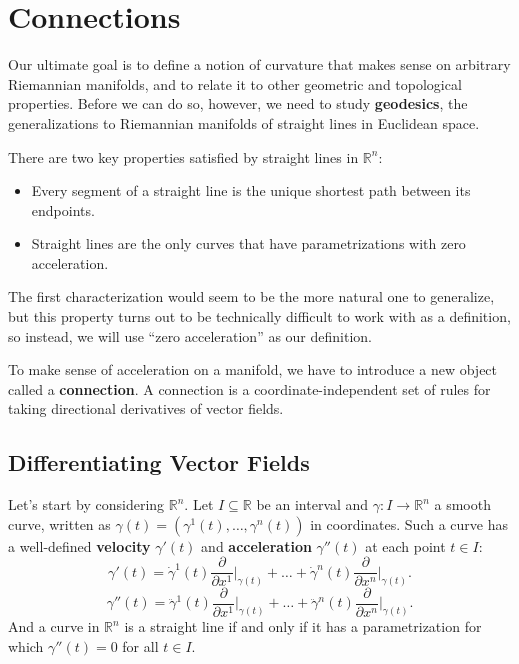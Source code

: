 \documentclass[../main.tex]{subfiles}
\begin{document}
\chapter{Connections}

Our ultimate goal is to define a notion of curvature that makes sense on arbitrary Riemannian manifolds, and to relate it to other geometric and topological properties. Before we can do so, however, we need to study \textbf{geodesics}, the generalizations to Riemannian manifolds of straight lines in Euclidean space.

There are two key properties satisfied by straight lines in $\mathbb{R}^n$:
\begin{itemize}
	\item Every segment of a straight line is the unique shortest path between its endpoints.
	\item Straight lines are the only curves that have parametrizations with zero acceleration.
\end{itemize}
The first characterization would seem to be the more natural one to generalize, but this property turns out to be technically difficult to work with as a definition, so instead, we will use ``zero acceleration'' as our definition.

To make sense of acceleration on a manifold, we have to introduce a new object called a \textbf{connection}. A connection is a coordinate-independent set of rules for taking directional derivatives of vector fields.

\section{Differentiating Vector Fields}
Let's start by considering $\mathbb{R}^n$. Let $I \subseteq \mathbb{R}$ be an interval and $\gamma: I \to \mathbb{R}^n$ a smooth curve, written as $\gamma(t) = (\gamma^1(t), \ldots, \gamma^n(t))$ in coordinates. Such a curve has a well-defined \textbf{velocity} $\gamma'(t)$ and \textbf{acceleration} $\gamma''(t)$ at each point $t \in I$:
\begin{equation}
	\gamma'(t) = \dot{\gamma}^1(t) \frac{\partial}{\partial x^1} \bigg|_{\gamma(t)} + \ldots + \dot{\gamma}^n(t) \frac{\partial}{\partial x^n} \bigg|_{\gamma(t)}.
\end{equation}
\begin{equation}
	\gamma''(t) = \ddot{\gamma}^1(t) \frac{\partial}{\partial x^1} \bigg|_{\gamma(t)} + \ldots + \ddot{\gamma}^n(t) \frac{\partial}{\partial x^n} \bigg|_{\gamma(t)}.
\end{equation}
And a curve in $\mathbb{R}^n$ is a straight line if and only if it has a parametrization for which $\gamma''(t) = 0$ for all $t \in I$.
\end{document}
